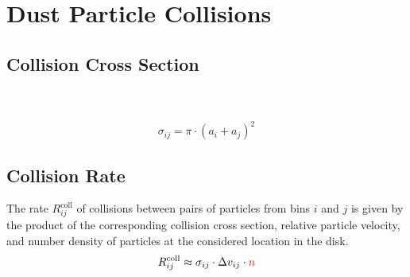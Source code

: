         


\newpage
\section{Dust Particle Collisions}

    \subsection{Collision Cross Section}
        
         \\

         \\

        \begin{equation}
            \sigma_{ij} = \pi \cdot (a_i+a_j)^2
        \end{equation}

    \subsection{Collision Rate}

        The rate $R^\text{coll}_{ij}$ of collisions between pairs of particles from bins $i$ 
        and $j$ is given by the product of the corresponding collision cross section, relative particle velocity, and number density of particles at the considered location in the disk. 
        \begin{equation}                                            %
            R^\text{coll}_{ij}
                \approx \sigma_{ij} \cdot \Delta v_{ij} \cdot \textcolor{red}{n}
        \end{equation}

        

